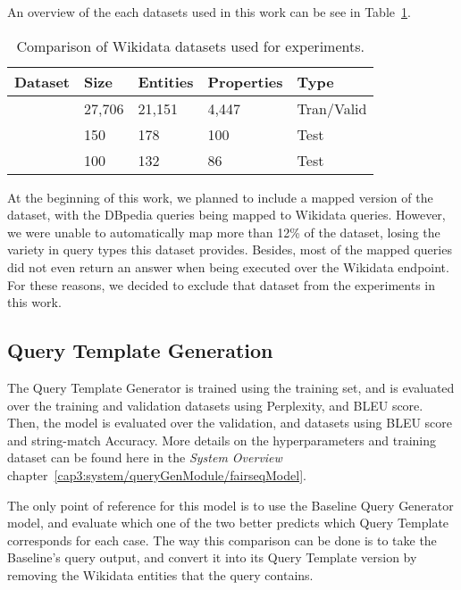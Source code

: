 An overview of the each datasets used in this work can be see in Table~\ref{table:datasetsOverview}.

\begin{table}[h!]
    \centering
    \begin{tabular}{|l|l|l|l|l|}
    \hline
    \textbf{Dataset} & \textbf{Size} & \textbf{Entities} & \textbf{Properties} & \textbf{Type} \\ \hline
    \LCQuADtwo{}        & 27,706        & 21,151            & 4,447               & Tran/Valid    \\ \hline
    \QALDseven{}           & 150           & 178               & 100                 & Test          \\ \hline
    \WikiSPARQL{}       & 100           & 132               & 86                  & Test          \\ \hline
    \end{tabular}
    \caption{Comparison of Wikidata datasets used for experiments.}
    \label{table:datasetsOverview}
\end{table}

At the beginning of this work, we planned to include a mapped version of the 
\DBNQA{}~\cite{dataset:dbnqa-hartmann-marx-soru-2018} dataset,
with the DBpedia queries being mapped to Wikidata queries. However, we were unable 
to automatically map more than 12\% of the dataset, losing the variety in query types this 
dataset provides. Besides, most of the mapped queries did not even return an answer when 
being executed over the Wikidata endpoint. For these reasons, we decided to exclude 
that dataset from the experiments in this work.


\subsection{Query Template Generation}
\label{cap4:experimentalDesign/queryTemplateGeneration}
The Query Template Generator is trained using the \LCQuADtwo{} training set, and is 
evaluated over the training and validation datasets using Perplexity, and BLEU score. 
Then, the model is evaluated over the \LCQuADtwo{} validation, \QALDseven{} and 
\WikiSPARQL{} datasets using BLEU score and string-match Accuracy. More details on the 
hyperparameters and training dataset can be found here in the \textit{System Overview} 
chapter~\ref{cap3:system/queryGenModule/fairseqModel}.

The only point of reference for this model is to use the Baseline Query Generator model, and 
evaluate which one of the two better predicts which Query Template corresponds for each case. 
The way this comparison can be done is to take the Baseline's \SPARQL{} query output, and convert it 
into its Query Template version by removing the Wikidata entities that the query contains.

